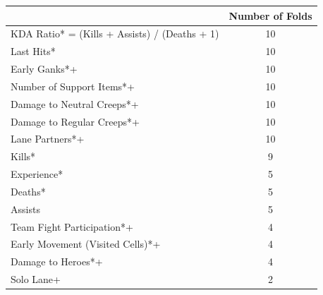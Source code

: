 \begin{table}[]
\centering
\begin{tabular}{|l|c|}
\hline
\rowcolor[HTML]{BBDAFF} 
\multicolumn{1}{|c|}{\cellcolor[HTML]{BBDAFF}\textbf{Attribute}} & \textbf{Number of Folds} \\ \hline
KDA Ratio* = (Kills + Assists) / (Deaths + 1)                    & 10                       \\ \hline
\rowcolor[HTML]{FFFFC7} 
Last Hits*                                                       & 10                       \\ \hline
Early Ganks*+                                                    & 10                       \\ \hline
\rowcolor[HTML]{FFFFC7} 
Number of Support Items*+                                        & 10                       \\ \hline
Damage to Neutral Creeps*+                                       & 10                       \\ \hline
\rowcolor[HTML]{FFFFC7} 
Damage to Regular Creeps*+                                       & 10                       \\ \hline
Lane Partners*+                                                  & 10                       \\ \hline
\rowcolor[HTML]{FFFFC7} 
Kills*                                                           & 9                        \\ \hline
Experience*                                                      & 5                        \\ \hline
\rowcolor[HTML]{FFFFC7} 
Deaths*                                                          & 5                        \\ \hline
Assists                                                          & 5                        \\ \hline
\rowcolor[HTML]{FFFFC7} 
Team Fight Participation*+                                       & 4                        \\ \hline
Early Movement (Visited Cells)*+                                 & 4                        \\ \hline
\rowcolor[HTML]{FFFFC7} 
Damage to Heroes*+                                               & 4                        \\ \hline
Solo Lane+                                                       & 2                        \\ \hline

\end{tabular}
\end{table}
